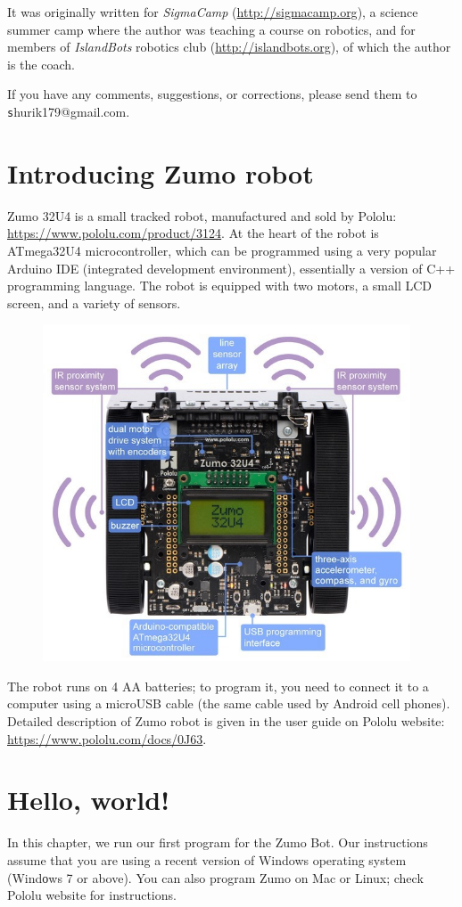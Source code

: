 \documentclass[oneside]{stml-l}
\numberwithin{figure}{chapter}
\begin{document}
It was originally written for  {\sl SigmaCamp}
(\url{http://sigmacamp.org}),  a science summer camp where the author was
teaching a course on robotics, and for members of {\sl IslandBots} robotics
club (\url{http://islandbots.org}), of which the author is the coach. 


If you have any  comments, suggestions, or corrections, please send them
to {\texttt shurik179@gmail.com}. 

\chapter{Introducing Zumo robot}
Zumo 32U4 is a small tracked robot, manufactured  and sold by Pololu:
\url{https://www.pololu.com/product/3124}. At the heart of the robot is 
ATmega32U4 microcontroller, which can be programmed using a very
 popular Arduino IDE (integrated development environment), essentially 
 a version of C++ programming language. The robot is equipped with two motors, 
 a small LCD screen, and a variety of sensors. 
 \begin{figure}[ht]
 \includegraphics[height=10cm]{figures/zumo-overview.jpg}
 \end{figure}

The robot runs on 4 AA batteries; to program it, you need to connect it to a 
computer using a microUSB cable (the same cable  used by Android cell phones). 
Detailed description of Zumo robot is given in the user guide on Pololu website:
\url{https://www.pololu.com/docs/0J63}.


\chapter{Hello, world!}
In this chapter, we run our first program for the Zumo Bot. Our instructions 
assume that you are  using a recent version of Windows operating system 
(Windоws 7 or above). You can also program Zumo on  Mac or Linux; check  
Pololu website for instructions.
\end{document}
